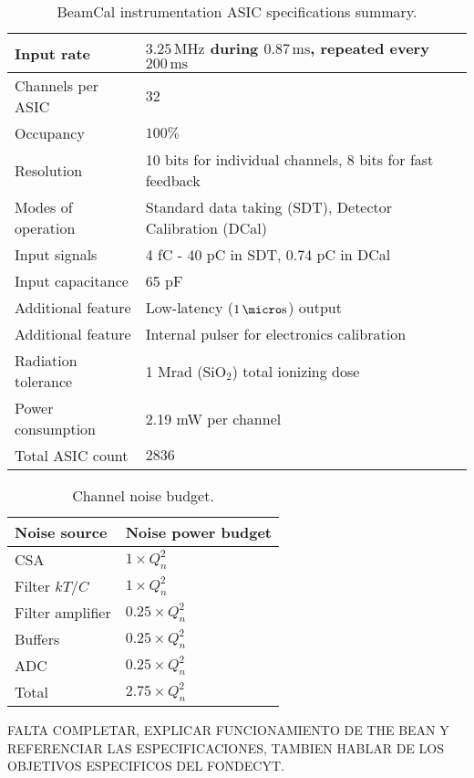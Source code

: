 \begin{table}[!t]
	\begin{center}
		\begin{tabular}{|l|l|}\hline
			Input rate & $3.25\,\text{MHz}$ during $0.87\,\text{ms}$, repeated every $200\,\text{ms}$ \\ \hline
			Channels per ASIC & $32$ \\ \hline
			Occupancy & $100\%$ \\ \hline
			Resolution & 10 bits for individual channels, 8 bits for fast feedback \\ \hline
			Modes of operation & Standard data taking (SDT), Detector Calibration (DCal) \\ \hline
			Input signals & 4 fC - 40 pC in SDT, 0.74 pC in DCal \\ \hline
			Input capacitance & 65 pF \\ \hline
			Additional feature & Low-latency ($1\,\micro\text{s}$) output \\ \hline
			Additional feature & Internal pulser for electronics calibration \\ \hline
			Radiation tolerance & 1 Mrad ($\text{SiO}_2$) total ionizing dose \\ \hline
			Power consumption & 2.19 mW per channel \\ \hline
			Total ASIC count & $2836$ \\\hline
		\end{tabular}
		\vspace*{5pt}
		\caption{BeamCal instrumentation ASIC specifications summary.}\label{tab:bean_specs}
	\end{center}
\end{table}

\begin{table}[!t]
	\begin{center}
		\begin{tabular}{|l|l|}\hline
			{\bf Noise source} & {\bf Noise power budget} \\ \hline\hline
			CSA & $1\times Q_n^2$ \\ \hline
			Filter $kT/C$ & $1\times Q_n^2$ \\ \hline
			Filter amplifier & $0.25\times Q_n^2$ \\\hline 
			Buffers & $0.25\times Q_n^2$ \\ \hline
			ADC & $0.25\times Q_n^2$ \\ \hline
			Total & $2.75\times Q_n^2$ \\\hline
		\end{tabular}
		\vspace*{5pt}
		\caption{Channel noise budget.}\label{tab:noise_budget}
	\end{center}
\end{table}

FALTA COMPLETAR, EXPLICAR FUNCIONAMIENTO DE THE BEAN Y REFERENCIAR LAS ESPECIFICACIONES, TAMBIEN HABLAR DE LOS OBJETIVOS ESPECIFICOS DEL FONDECYT.